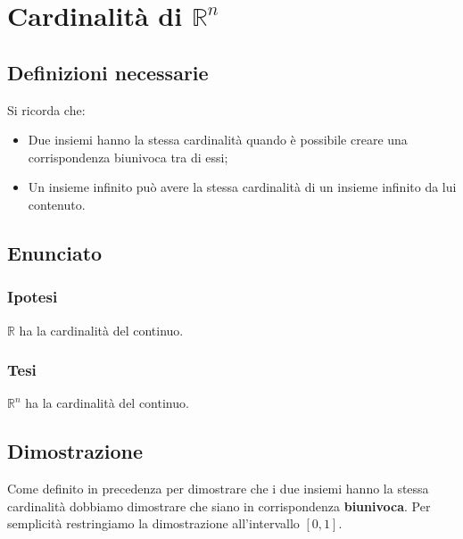 \documentclass[../../analisi1]{subfiles}
\begin{document}
    \chapter{Cardinalità \texorpdfstring{di \(\mathbb{R}^n\)}{del continuo}}

        \section*{Definizioni necessarie}

            Si ricorda che:

            \begin{itemize}
                \item Due insiemi hanno la stessa cardinalità quando è possibile creare una corrispondenza biunivoca tra di essi;
                \item Un insieme infinito può avere la stessa cardinalità di un insieme infinito da lui contenuto.
            \end{itemize}

        \section*{Enunciato}

            \subsection*{Ipotesi}

            \( \mathbb{R} \) ha la cardinalità del continuo.

            \subsection*{Tesi}

            \( \mathbb{R}^n \) ha la cardinalità del continuo.                

        \section*{Dimostrazione}

            Come definito in precedenza per dimostrare che i due insiemi hanno la stessa cardinalità 
            dobbiamo dimostrare che siano in corrispondenza \textbf{biunivoca}. 
            Per semplicità restringiamo la dimostrazione all'intervallo \([0, 1]\).
            
\end{document}

